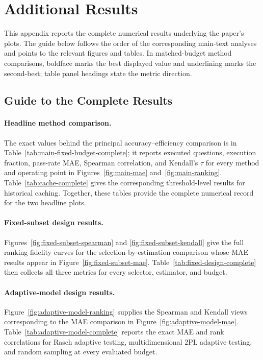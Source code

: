 \section{Additional Results}
\label{sec:appendix-results}

This appendix reports the complete numerical results underlying the paper's
plots. The guide below follows the order of the corresponding main-text
analyses and points to the relevant figures and tables. In matched-budget
method comparisons, boldface marks the best displayed value and underlining
marks the second-best; table panel headings state the metric direction.

\subsection{Guide to the Complete Results}
\label{sec:appendix-guide}

\paragraph{Headline method comparison.}
The exact values behind the principal accuracy--efficiency
comparison is in Table~\ref{tab:main-fixed-budget-complete}; it reports
executed questions, execution fraction, pass-rate MAE, Spearman correlation,
and Kendall's $\tau$ for every method and operating point in
Figures~\ref{fig:main-mae} and~\ref{fig:main-ranking}.
Table~\ref{tab:cache-complete} gives the
corresponding threshold-level results for historical caching. Together, these
tables provide the complete numerical record for the two headline plots.

\paragraph{Fixed-subset design results.}
Figures~\ref{fig:fixed-subset-spearman} and
\ref{fig:fixed-subset-kendall} give the full ranking-fidelity curves for the
selection-by-estimation comparison whose MAE results appear in
Figure~\ref{fig:fixed-subset-mae}. Table~\ref{tab:fixed-design-complete}
then collects all three metrics for every selector, estimator, and budget. 

\paragraph{Adaptive-model design results.}
Figure~\ref{fig:adaptive-model-ranking} supplies the Spearman and Kendall views
corresponding to the MAE comparison in Figure~\ref{fig:adaptive-model-mae}.
Table~\ref{tab:adaptive-model-complete} reports the exact MAE and rank correlations
for Rasch adaptive testing, multidimensional 2PL adaptive testing, and random
sampling at every evaluated budget.

